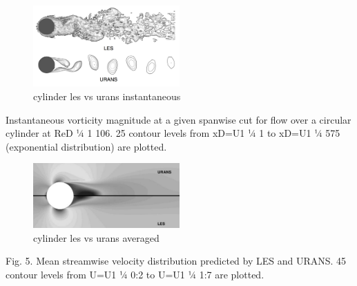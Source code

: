 \documentclass[journal]{new-aiaa}
\begin{document}
\begin{figure}[H]
\begin{center}
\includegraphics[width=0.5\textwidth]{Images/logan/catalano_2003numerical_UnsteadyURANSvsLES.pdf}
\caption{ cylinder les vs urans instantaneous \cite{catalano2003numerical} }
\label{fig:lesvsuranscylinderinstant}
\end{center}
\end{figure}

Instantaneous vorticity magnitude at a given spanwise cut for flow over a circular cylinder at ReD 1⁄4 1   106. 25 contour levels from xD=U1 1⁄4 1 to xD=U1 1⁄4 575 (exponential distribution) are plotted.


\begin{figure}[H]
\begin{center}
\includegraphics[width=0.5\textwidth]{Images/logan/catalano_2003numerical_SteadyURANSvsLES.pdf}
\caption{ cylinder les vs urans averaged \cite{catalano2003numerical} }
\label{fig:lesvsuranscylinderaveraged}
\end{center}
\end{figure}

Fig. 5. Mean streamwise velocity distribution predicted by LES and URANS. 45 contour levels from U=U1 1⁄4  0:2 to U=U1 1⁄4 1:7 are plotted.
\end{document}
